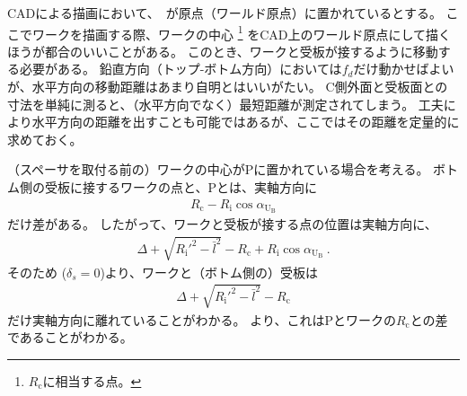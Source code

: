 

CADによる描画において、\TableCenter　が原点（ワールド原点）に置かれているとする。
ここでワークを描画する際、ワークの中心
\footnote{$R_\mathrm c$に相当する点。}\relax
をCAD上のワールド原点にして描くほうが都合のいいことがある。
このとき、ワークと受板が接するように移動する必要がある。
鉛直方向（トップ-ボトム方向）においては$f_d$だけ動かせばよいが、水平方向の移動距離はあまり自明とはいいがたい。
C側外面と受板面との寸法を単純に測ると、（水平方向でなく）最短距離が測定されてしまう。
工夫により水平方向の距離を出すことも可能ではあるが、ここではその距離を定量的に求めておく。



（スペーサを取付る前の）ワークの中心が\TableCenter Pに置かれている場合を考える。
ボトム側の受板に接するワークの点と、\TableCenter Pとは、実軸方向に
\begin{align*}
  R_\mathrm c-R_\mathrm i\cos\alpha_{\mathrm U_\mathrm B}
\end{align*}
だけ差がある。
したがって、ワークと受板が接する点の位置は実軸方向に、
\begin{align*}
  \Delta+\sqrt{R_\mathrm i'^2-\bar l^2}-R_\mathrm c+R_\mathrm i\cos\alpha_{\mathrm U_\mathrm B}\ .
\end{align*}
そのため ($\delta_s = 0$)より、ワークと（ボトム側の）受板は
\begin{align*}
  \Delta+\sqrt{R_\mathrm i'^2-\bar l^2}-R_\mathrm c
\end{align*}
だけ実軸方向に離れていることがわかる。
より、これは\TableCenter Pとワークの\CenterCurvature$R_\mathrm c$との差であることがわかる。



